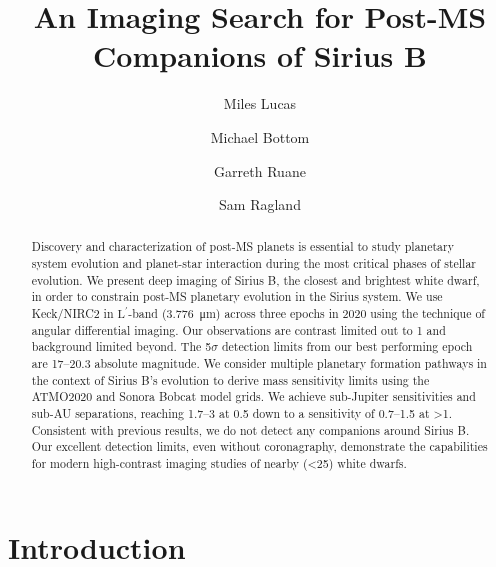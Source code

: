 \documentclass[twocolumn]{aastex631}
\newcommand\Lp{$\mathrm{L}^\prime$}
\begin{document}
\title{An Imaging Search for Post-MS Companions of Sirius B}



\author[0000-0001-6341-310X]{Miles Lucas}

\author[0000-0003-1341-5531]{Michael Bottom}

\author[0000-0003-4769-1665]{Garreth Ruane}

\author[0000-0002-0696-1780]{Sam Ragland}


\begin{abstract}
Discovery and characterization of post-MS planets is essential to study planetary system evolution and planet-star interaction during the most critical phases of stellar evolution. We present deep imaging of Sirius B, the closest and brightest white dwarf, in order to constrain post-MS planetary evolution in the Sirius system. We use Keck/NIRC2 in \Lp-band (\qty{3.776}{\micro\meter}) across three epochs in 2020 using the technique of angular differential imaging. Our observations are contrast limited out to \qty{1}{\au} and background limited beyond. The 5$\sigma$ detection limits from our best performing epoch are \numrange{17}{20.3} absolute magnitude. We consider multiple planetary formation pathways in the context of Sirius B's evolution to derive mass sensitivity limits using the ATMO2020 and Sonora Bobcat model grids. We achieve sub-Jupiter sensitivities and sub-AU separations, reaching \qtyrange{1.7}{3}{\jupitermass} at \qty{0.5}{\au} down to a sensitivity of \qtyrange{0.7}{1.5}{\jupitermass} at \textgreater\qty{1}{\au}. Consistent with previous results, we do not detect any companions around Sirius B. Our excellent detection limits, even without coronagraphy, demonstrate the capabilities for modern high-contrast imaging studies of nearby (\textless\qty{25}{\parsec}) white dwarfs.
\end{abstract}

\section{Introduction} \label{sec:intro}
\end{document}
